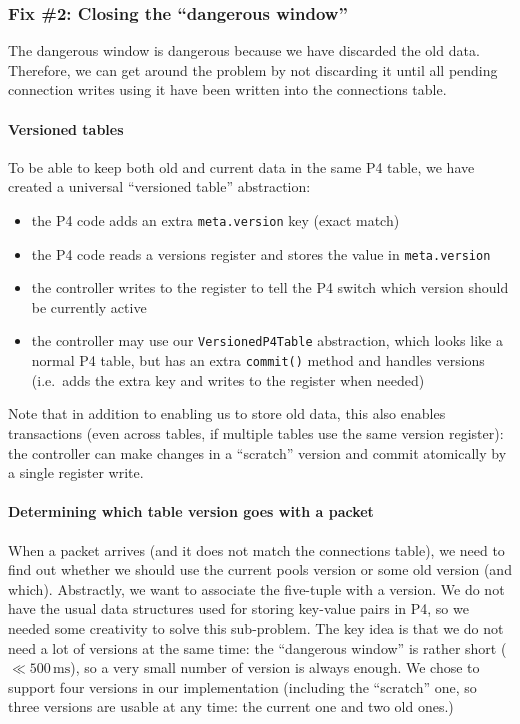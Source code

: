 \documentclass[11pt,oneside,a4paper]{article}
\begin{document}
\subsubsection{Fix \#2: Closing the ``dangerous window''}
The dangerous window is dangerous because we have discarded the old data.
Therefore, we can get around the problem by not discarding it until all pending
connection writes using it have been written into the connections table.

\paragraph{Versioned tables}
To be able to keep both old and current data in the same P4 table, we have
created a universal ``versioned table'' abstraction:

\begin{itemize}
\item the P4 code adds an extra \texttt{meta.version} key (exact match)
\item the P4 code reads a versions register and stores the value in
    \texttt{meta.version}
\item the controller writes to the register to tell the P4 switch which version
    should be currently active
\item the controller may use our \texttt{VersionedP4Table} abstraction, which
    looks like a normal P4 table, but has an extra \texttt{commit()} method and
    handles versions (i.e.~adds the extra key and writes to the register when
    needed)
\end{itemize}

Note that in addition to enabling us to store old data, this also enables
transactions (even across tables, if multiple tables use the same version
register): the controller can make changes in a ``scratch'' version and commit
atomically by a single register write.

\paragraph{Determining which table version goes with a packet}

When a packet arrives (and it does not match the connections table), we need to
find out whether we should use the current pools version or some old version
(and which).
Abstractly, we want to associate the five-tuple with a version.
We do not have the usual data structures used for storing key-value pairs in P4,
so we needed some creativity to solve this sub-problem.
The key idea is that we do not need a lot of versions at the same time: the
``dangerous window'' is rather short ($\ll 500\,\mathrm{ms}$), so a very small number of
version is always enough.
We chose to support four versions in our implementation (including the
``scratch'' one, so three versions are usable at any time: the current one and
two old ones.)
\end{document}

